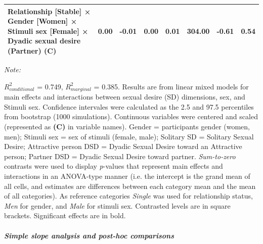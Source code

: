 \documentclass[
  bookmarksnumbered]{article}
\begin{document}
\begin{table}[H]
{\begin{threeparttable}
\begin{tabular}[t]{lccccccc}
Relationship [Stable] × Gender [Women] × Stimuli sex [Female] × Dyadic sexual desire (Partner) (C) & 0.00 & -0.01 & 0.00 & 0.01 & 304.00 & -0.61 & 0.54\\
\bottomrule
\end{tabular}
\begin{tablenotes}[para]
\item \textit{Note: } 
\item $R^2_{conditional}$ = 0.749, $R^2_{marginal}$ = 0.385. Results are from linear mixed models for main 
                              effects and interactions between sexual desire (SD) dimensions,
                              sex, and Stimuli sex.
                              Confidence intervales were calculated as the 2.5 and 97.5 
                              percentiles from bootstrap (1000 simulations).
                              Continuous variables were centered and scaled
                              (represented as \textbf{(C)} in variable names).
                              Gender = participants gender (women, men); 
                              Stimuli sex = sex of stimuli (female, male); 
                              Solitary SD = Solitary Sexual Desire;
                              Attractive person DSD = Dyadic Sexual Desire toward an 
                              Attractive person;
                              Partner DSD = Dyadic Sexual Desire toward partner.
                              \textit{Sum-to-zero} contrasts were used to display
                              \textit{p}-values that represent main effects and interactions 
                              in an ANOVA-type manner (i.e. the intercept is the grand mean of 
                              all cells, and estimates are differences between each category
                              mean and the mean of all categories).
                              As reference categories 
                              \textit{Single} was used for relationship status,
                              \textit{Men} for gender,
                              and \textit{Male} for stimuli sex. 
                              Contrasted levels are in square brackets. 
                              Significant effects are in bold.
\end{tablenotes}
\end{threeparttable}}
\end{table}

\hypertarget{simple-slope-analysis-and-post-hoc-comparisons}{%
\subparagraph{\texorpdfstring{Simple slope analysis and \emph{post-hoc} comparisons}{Simple slope analysis and post-hoc comparisons}}\label{simple-slope-analysis-and-post-hoc-comparisons}}
\end{document}
